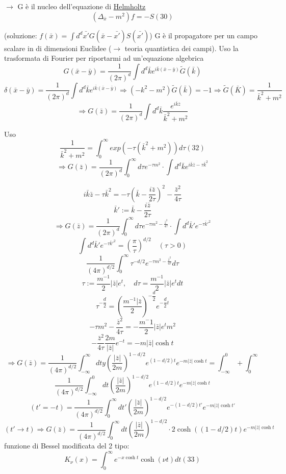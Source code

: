 \documentclass[a4paper,11pt]{report}
\newcommand{\kk}{\bar{k}}
\newcommand{\kp}{\bar{k}'}
\newcommand{\z}{\bar{z}}
\begin{document}
$\rightarrow$ G è il nucleo dell'equazione di \underline{Helmholtz} 
\begin{equation}
(\Delta_{\bar{x}}-m^2)f=-S (30)
\end{equation}

(soluzione: $f(\bar{x})=\int d^d\bar{x'}G(\bar{x}-\bar{x'})S(\bar{x'})$)
G è il propagatore per un campo scalare in di dimensioni Euclidee ($\rightarrow$ teoria quantistica dei campi). Uso la trasformata di Fourier per riportarmi ad un'equazione algebrica
$$
G(\bar{x}-\bar{y})=\dfrac{1}{(2\pi)^d}\int d^d \bar{k}e^{i\bar{k}(\bar{x}-\bar{y})}\tilde{G}(\bar{k})
$$
$$
\delta(\bar{x}-\bar{y})=\dfrac{1}{(2\pi)^d}\int d^d \bar{k}e^{i\bar{k}(\bar{x}-\bar{y})} \Rightarrow (-k^2-m^2)\tilde{G}(\bar{k})=-1\Rightarrow \tilde{G}(\bar{K})=\dfrac{1}{\bar{k}^2+m^2}
$$
\begin{equation}
\Rightarrow G(\bar{z})=\dfrac{1}{(2\pi)^d}\int d^d \bar{k} \dfrac{e^{i\bar{k}\bar{z}}}{\bar{k}^2+m^2}
\end{equation}

Uso 
\begin{equation}
\dfrac{1}{\bar{k}^2+m^2}=\int_0^{\infty}exp\left( -\tau(\bar{k}^2+m^2)\right)d\tau (32)
\end{equation}
$$
\Rightarrow G(\bar{z})=\dfrac{1}{(2\pi)^d}\int_0^{\infty}d\tau e^{-\tau m^2}\cdot\int d^d \bar{k} e^{i\bar{k}\bar{z}-\tau\bar{k}^2}
$$

$$
i\kk\bar{z}-\tau\kk^2=-\tau(\kk-\dfrac{i\bar
z}{2\tau})^2-\dfrac{\bar{z}^2}{4\tau}
$$
$$
\kp:=\kk-\dfrac{i\bar
z}{2\tau}
$$
$$
\Rightarrow G(\bar{z})=\dfrac{1}{(2\pi)^d}\int_0^{\infty}d\tau e^{-\tau m^2-\frac{\bar{z}^2}{4\tau}}\cdot\int d^d\kp e^{-\tau\kp^2}
$$
$$
\int d^d\kp e^{-\tau\kp^2}=\left(\dfrac{\pi}{\tau}\right)^{d/2} \quad (\tau>0)
$$
$$
\dfrac{1}{(4\pi)^{d/2}}\int_{0}^{\infty}\tau^{-d/2}e^{-\tau m^2 - \frac{\bar{z}^2}{4\tau}}d\tau
$$
$$
\tau:=\dfrac{m^{-1}}{2}|\bar{z}|e^t, \quad d\tau=\dfrac{m^{-1}}{2}|\bar{z}|e^tdt
$$
$$
\tau^{-\dfrac{d}{2}}=\left(\dfrac{m^{-1}|\bar{z}}{2}\right)^{-\dfrac{d}{2}}e^{-\dfrac{d}{2}t}
$$
$$
-\tau m^2-\dfrac{\bar{z}^2}{4\tau}=-\dfrac{m^-1}{2}|\bar{z}|e^t m^2
$$
$$
-\dfrac{\bar{z}^2}{4\tau}\dfrac{2m}{|\bar{z}|}e^{-t}=-m|\bar{z}|\cosh t
$$
$$
\Rightarrow G(\bar{z})=\dfrac{1}{(4\pi)^{d/2}}\int_{-\infty}^{\infty}dty\left(\dfrac{|\bar{z}|}{2m}\right)^{1-d/2}e^{(1-d/2)t}e^{-m|\z|\cosh t} =\int_{-\infty}^{0}+\int_{0}^{\infty} 
$$
$$
\dfrac{1}{(4\pi)^{d/2}}\int_{-\infty}^{0}dt\left(\dfrac{|\z|}{2m}\right)^{1-d/2}e^{(1-d/2)t}e^{-m|\z|\cosh t}
$$
$$
(t'=-t)=\dfrac{1}{(4\pi)^{d/2}}\int_0^\infty dt'\left(\dfrac{|\bar{z}|}{2m}\right)^{1-d/2}e^{-(1-d/2)t'}e^{-m|\bar{z}|\cosh t'}
$$
$$
(t'\rightarrow t)\Rightarrow G(\bar{z})=\dfrac{1}{(4\pi)^{d/2}}\int_0^{\infty}dt\left(\dfrac{|\bar{z}|}{2m}\right)^{1-d/2}\cdot 2\cosh ((1-d/2)t)e^{-m|\bar{z}|\cosh t}
$$
funzione di Bessel modificata del 2 tipo:
\begin{equation}
K_{\nu}(x)=\int_0^{\infty}e^{-x\cosh t}\cosh(\nu t)dt (33)
\end{equation}
\end{document}
